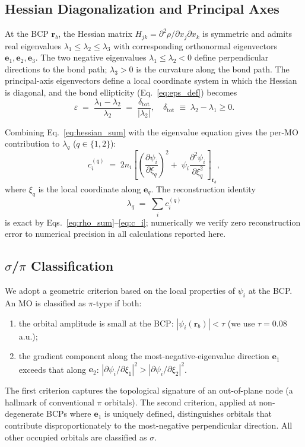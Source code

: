 \documentclass[11pt,a4paper]{article}
\newcommand{\eps}{\varepsilon}
\begin{document}
\subsection{Hessian Diagonalization and Principal Axes}

At the BCP $\mathbf{r}_b$, the Hessian matrix
$H_{jk} = \partial^2 \rho / \partial x_j \partial x_k$ is symmetric
and admits real eigenvalues $\lambda_1 \le \lambda_2 \le \lambda_3$
with corresponding orthonormal eigenvectors
$\mathbf{e}_1, \mathbf{e}_2, \mathbf{e}_3$. The two negative
eigenvalues $\lambda_1 \le \lambda_2 < 0$ define perpendicular
directions to the bond path; $\lambda_3 > 0$ is the curvature along
the bond path. The principal-axis eigenvectors define a local
coordinate system in which the Hessian is diagonal, and the bond
ellipticity (Eq.~\ref{eq:eps_def}) becomes
\begin{equation}
\eps \;=\; \frac{\lambda_1 - \lambda_2}{\lambda_2}
       \;=\; \frac{\delta_{\text{tot}}}{|\lambda_2|},
\quad
\delta_{\text{tot}} \;\equiv\; \lambda_2 - \lambda_1 \ge 0.
\label{eq:eps_delta}
\end{equation}

Combining Eq.~\ref{eq:hessian_sum} with the eigenvalue equation gives
the per-MO contribution to $\lambda_q$ ($q \in \{1, 2\}$):
\begin{equation}
c_i^{(q)}
\;=\;
2 n_i \!\left[
   \left(\frac{\partial \psi_i}{\partial \xi_q}\right)^{\!2}
   \!\!\!+\;
   \psi_i \frac{\partial^2 \psi_i}{\partial \xi_q^2}
\right]_{\!\mathbf{r}_b},
\label{eq:c_i}
\end{equation}
where $\xi_q$ is the local coordinate along $\mathbf{e}_q$. The
reconstruction identity
\begin{equation}
\lambda_q \;=\; \sum_{i} c_i^{(q)}
\label{eq:reconstruction}
\end{equation}
is exact by Eqs.~\ref{eq:rho_sum}--\ref{eq:c_i}; numerically we
verify zero reconstruction error to numerical precision in all
calculations reported here.

\subsection{$\sigma$/$\pi$ Classification}

We adopt a geometric criterion based on the local properties of
$\psi_i$ at the BCP. An MO is classified as $\pi$-type if both:
\begin{enumerate}
\item the orbital amplitude is small at the BCP:
$|\psi_i(\mathbf{r}_b)| < \tau$ (we use $\tau = 0.08$ a.u.);
\item the gradient component along the most-negative-eigenvalue
direction $\mathbf{e}_1$ exceeds that along $\mathbf{e}_2$:
$|\partial \psi_i/\partial \xi_1|^2 > |\partial \psi_i/\partial \xi_2|^2$.
\end{enumerate}
The first criterion captures the topological signature of an
out-of-plane node (a hallmark of conventional $\pi$ orbitals). The
second criterion, applied at non-degenerate BCPs where
$\mathbf{e}_1$ is uniquely defined, distinguishes orbitals that
contribute disproportionately to the most-negative perpendicular
direction. All other occupied orbitals are classified as $\sigma$.
\end{document}
